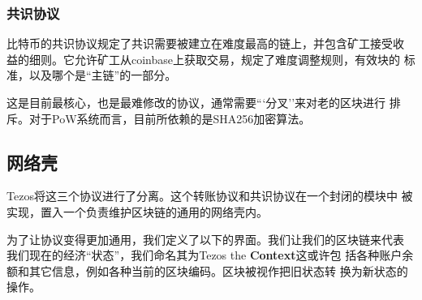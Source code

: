 \documentclass[letterpaper]{article}
\begin{document}
\subsubsection{共识协议}
比特币的共识协议规定了共识需要被建立在难度最高的链上，并包含矿工接受收
益的细则。它允许矿工从coinbase上获取交易，规定了难度调整规则，有效块的
标准，以及哪个是``主链''的一部分。

这是目前最核心，也是最难修改的协议，通常需要```分叉''来对老的区块进行
排斥。对于PoW系统而言，目前所依赖的是SHA256加密算法。

\subsection{网络壳}
Tezos将这三个协议进行了分离。这个转账协议和共识协议在一个封闭的模块中
被实现，置入一个负责维护区块链的通用的网络壳内。


为了让协议变得更加通用，我们定义了以下的界面。我们让我们的区块链来代表
我们现在的经济``状态''，我们命名其为Tezos the \textbf{Context}这或许包
括各种账户余额和其它信息，例如各种当前的区块编码。区块被视作把旧状态转
换为新状态的操作。
\end{document}
